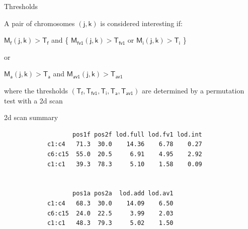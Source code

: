 \documentclass[12pt]{article}
\newcommand{\headsize}{\fontsize{35}{35} \selectfont}
\newcommand{\smallersize}{\fontsize{20}{25} \selectfont}
\newcommand{\M}{\text{M}}
\begin{document}
\newpage

\headsize \color{myyellow}
\hfill \begin{minipage}{5.75in}
\centering
Thresholds
\end{minipage}

\vspace{20mm}

\color{mywhite} \smallersize

\hfill \begin{minipage}[t]{9.5in}
A pair of chromosomes {\color{myblue} $\mathsf{(j,k)}$} is considered interesting if:

\vspace{25mm}

{\color{myblue}
\centerline{$ \mathsf{\M_f(j,k)} > \mathsf{ T_f }$ \hspace{5mm} {\color{mypink} and }
\hspace{5mm}
{\color{mypink} \{} $ \mathsf{\M_{fv1}(j,k)} > \mathsf{ T_{fv1} }$
{\color{mypink} or }
$ \mathsf{\M_i(j,k)} > \mathsf{ T_i }$  {\color{mypink} \}}}

\vspace{36pt}

\centerline{\color{mypink} or }

\vspace{36pt}

\centerline{$ \mathsf{\M_a(j,k)} > \mathsf{ T_a }$ \hspace{5mm} {\color{mypink} and }
\hspace{5mm}
$ \mathsf{\M_{av1}(j,k)} > \mathsf{ T_{av1} }$ }
}


\vspace{25mm}

where the thresholds {\color{myblue} $\mathsf{(T_f, T_{fv1}, T_i, T_a,
    T_{av1})}$} are determined by a permutation test with a 2d scan

\end{minipage} \hspace{0.5in}


\newpage

\headsize \color{myyellow}
\hfill \begin{minipage}{5.75in}
\centering
2d scan summary
\end{minipage}

\vspace{40mm}

\color{mywhite} \smallersize

\begin{verbatim}
                   pos1f pos2f lod.full lod.fv1 lod.int
            c1:c4   71.3  30.0    14.36    6.78    0.27
            c6:c15  55.0  20.5     6.91    4.95    2.92
            c1:c1   39.3  78.3     5.10    1.58    0.09


                   pos1a pos2a  lod.add lod.av1
            c1:c4   68.3  30.0    14.09    6.50
            c6:c15  24.0  22.5     3.99    2.03
            c1:c1   48.3  79.3     5.02    1.50
\end{verbatim}
\end{document}
